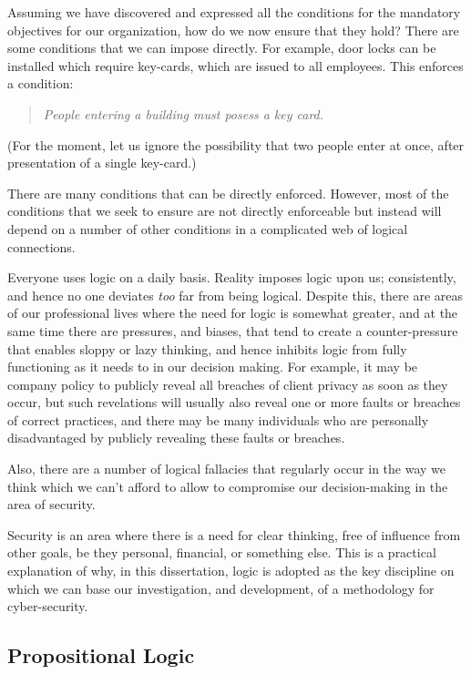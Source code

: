 Assuming we have discovered and expressed all the conditions for the mandatory objectives for our organization, how do we now ensure that they hold? There are some conditions that we can impose directly. For example, door locks can be installed which require key-cards, which are issued to all employees. This enforces a condition: 
\begin{quote}\em
People entering a building must posess a key card.
\end{quote}
(For the moment, let us ignore the possibility that two people enter at once, after presentation of a single key-card.)

There are many conditions that can be directly enforced. However, most of the conditions that we seek to ensure are not directly enforceable but instead will depend on a number of other conditions in a complicated web of logical connections.

Everyone uses logic on a daily basis. Reality imposes logic upon us; consistently, and hence no one deviates {\em too} far from being logical. Despite this, there are areas of our professional lives where the need for logic is somewhat greater, and at the same time there are pressures, and biases, that tend to create a counter-pressure that enables sloppy or lazy thinking, and hence inhibits logic from fully functioning as it needs to in our decision making. For example, it may be company policy to publicly reveal all breaches of client privacy as soon as they occur, but such revelations will usually also reveal one or more faults or breaches of correct practices, and there may be many individuals who are personally disadvantaged by publicly revealing these faults or breaches.

Also, there are a number of logical fallacies that regularly occur in the way we think which we can't afford to allow to compromise our decision-making in the area of security.

Security is an area where there is a need for clear thinking, free of influence from other goals, be they personal, financial, or something else. This is a practical explanation of why, in this dissertation, logic is adopted as the key discipline on which we can base our investigation, and development, of a methodology for cyber-security.

\subsection{Propositional Logic}

